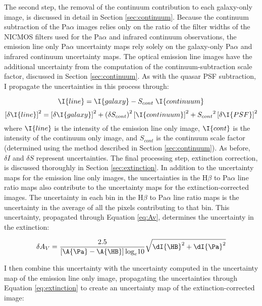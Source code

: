 
The second step, the removal of the continuum contribution to each galaxy-only image, is discussed in detail in Section \ref{sec:continuum}. Because the continuum subtraction of the Pa$\alpha$ images relies only on the ratio of the filter widths of the NICMOS filters used for the Pa$\alpha$ and infrared continuum observations, the emission line only Pa$\alpha$ uncertainty maps rely solely on the galaxy-only Pa$\alpha$ and infrared continuum uncertainty maps.  The optical emission line images have the additional uncertainty from the computation of the continuum-subtraction scale factor, discussed in Section \ref{sec:continuum}.  As with the quasar PSF subtraction, I propagate the uncertainties in this process through:

\begin{equation}
\I{line} = \I{galaxy} - S_{cont}\; \I{continuum}
\end{equation}
\begin{equation}
\left[\delta \I{line}\right]^2 = \left[\delta\I{galaxy}\right]^2 + \left(\delta S_{cont}\right)^2\left[\I{continuum}\right]^2  + {S_{cont}}^2\left[\delta\I{PSF}\right]^2
\end{equation}
where $\I{line}$ is the intensity of the emission line only image, $\I{cont}$ is the intensity of the continuum only image, and $S_{cont}$ is the continuum scale factor (determined using the method described in Section \ref{sec:continuum}). As before, $\delta I$ and $\delta S$ represent uncertainties.  The final processing step, extinction correction, is discussed thoroughly in Section \ref{sec:extinction}. In addition to the uncertainty maps for the emission line only images, the uncertainties in the H$\beta$ to Pa$\alpha$ line ratio maps also contribute to the uncertainty maps for the extinction-corrected images.  The uncertainty in each bin in the H$\beta$ to Pa$\alpha$ line ratio maps is the uncertainty in the average of all the pixels contributing to that bin. This uncertainty, propagated through Equation \ref{eq:Av}, determines the uncertainty in the extinction:

\begin{equation}
\delta A_V = \frac{2.5}{\left[\A{\Pa}-\A{\HB}\right]{\rm log}_e10}\sqrt{\dI{\HB}^2+\dI{\Pa}^2}
\end{equation}

I then combine this uncertainty with the uncertainty computed in the uncertainty map of the emission line only image, propagating the uncertainties through Equation \ref{eq:extinction} to create an uncertainty map of the extinction-corrected image:

